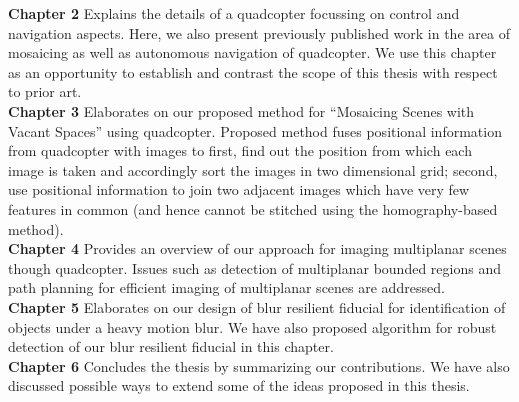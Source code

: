 \noindent \textbf{Chapter 2} Explains the details of a quadcopter focussing on
control and navigation aspects. Here, we also present previously published work
in the area of mosaicing as well as autonomous navigation of quadcopter.
We use this chapter as an opportunity to establish and contrast the scope of
this thesis with respect to prior art.\\

\noindent \textbf{Chapter 3} Elaborates on our proposed method for ``Mosaicing
Scenes with Vacant Spaces'' using quadcopter. Proposed method fuses positional information
from quadcopter with images to first, find out the position from which each
image is taken and accordingly sort the images in two dimensional grid; second,
use positional information to join two adjacent images which have very few features
in common (and hence cannot be stitched using the homography-based method).\\

\noindent \textbf{Chapter 4} Provides an overview of our approach
for imaging multiplanar scenes though quadcopter. Issues such as detection of
multiplanar bounded regions and path planning for efficient imaging of multiplanar scenes
are addressed.\\

\noindent \textbf{Chapter 5} Elaborates on our design of blur
resilient fiducial for identification of objects under a heavy motion blur. We
have also proposed algorithm for robust detection of our blur resilient
fiducial in this chapter.\\
 
 \noindent \textbf{Chapter 6} Concludes the thesis by summarizing our contributions.
  We have also discussed possible ways to extend some of the ideas proposed in this thesis.